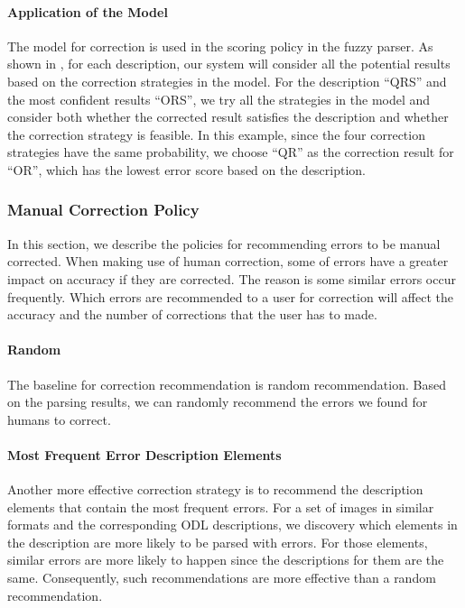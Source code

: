 \paragraph{Application of the Model}
The model for correction is used in the scoring policy in the 
fuzzy parser. As shown in , for each 
description, our system will consider all the potential  
results based on the correction strategies in the model. 
For the description ``QRS'' and the most confident results 
``ORS'', we try all the strategies in the model 
and consider both whether the corrected result satisfies the 
description and whether the correction strategy is 
feasible. In this example, since the four correction strategies 
have the same probability, we choose ``QR'' as the correction 
result for ``OR'', 
which has the lowest error score based on the description.  

\subsubsection{Manual Correction Policy}
In this section, we describe the policies for recommending 
errors to be manual corrected. When making use of human correction, 
some of errors have a greater impact on 
accuracy if they are corrected. The reason is some similar errors 
occur frequently. Which errors are recommended to a user 
for correction will affect the accuracy and the 
number of corrections that the user has to made. 

\paragraph{Random}
The baseline for correction recommendation is random 
recommendation. Based on the parsing results, we can randomly 
recommend the errors we found for humans to correct.  


\paragraph{Most Frequent Error Description Elements}
Another more effective correction strategy is to 
recommend the description 
elements that contain the most frequent errors. For a set of images 
in similar formats and the corresponding ODL descriptions, 
we discovery which elements in the description are more likely 
to be parsed with errors. For those elements, similar errors 
are more likely to happen since the descriptions for them are the 
same. Consequently, such recommendations are more effective
than a random recommendation. 

